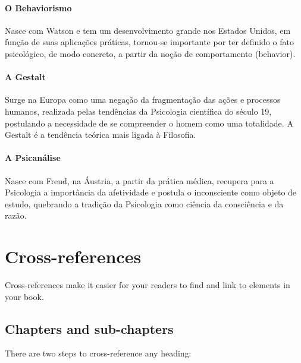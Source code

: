 \documentclass[
]{book}
\theoremstyle{definition}
\theoremstyle{definition}
\theoremstyle{definition}
\theoremstyle{definition}
\theoremstyle{remark}
\begin{document}
\hypertarget{o-behaviorismo}{%
\subsubsection*{O Behaviorismo}\label{o-behaviorismo}}

Nasce com Watson e tem um desenvolvimento grande nos Estados Unidos, em função de suas aplicações práticas, tornou-se importante por ter definido o fato psicológico, de modo concreto, a partir da noção de comportamento (behavior).

\hypertarget{a-gestalt}{%
\subsubsection*{A Gestalt}\label{a-gestalt}}

Surge na Europa como uma negação da fragmentação das ações e processos humanos, realizada pelas tendências da Psicologia científica do século 19, postulando a necessidade de se compreender o homem como uma totalidade. A Gestalt é a tendência teórica mais ligada à Filosofia.

\hypertarget{a-psicanuxe1lise}{%
\subsubsection*{A Psicanálise}\label{a-psicanuxe1lise}}

Nasce com Freud, na Áustria, a partir da prática médica, recupera para a Psicologia a importância da afetividade e postula o inconsciente como objeto de estudo, quebrando a tradição da Psicologia como ciência da consciência e da razão.

\hypertarget{cross}{%
\chapter{Cross-references}\label{cross}}

Cross-references make it easier for your readers to find and link to elements in your book.

\hypertarget{chapters-and-sub-chapters}{%
\section{Chapters and sub-chapters}\label{chapters-and-sub-chapters}}

There are two steps to cross-reference any heading:
\end{document}
